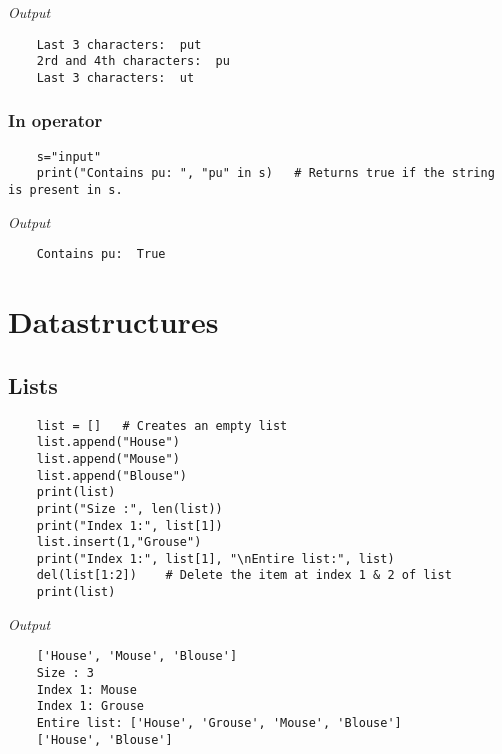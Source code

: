 \documentclass{report}
\begin{document}
	\textit{Output}
	\vspace{-15pt}
	\begin{verbatim}
	Last 3 characters:  put
	2rd and 4th characters:  pu
	Last 3 characters:  ut
	\end{verbatim}
	\vspace{-10pt}
	
	\subsection{In operator}
	\vspace{-15pt}
	\begin{verbatim}
	s="input"
	print("Contains pu: ", "pu" in s)   # Returns true if the string is present in s.
	\end{verbatim}
	\vspace{-10pt}
	
	\textit{Output}
	\vspace{-15pt}
	\begin{verbatim}
	Contains pu:  True
	\end{verbatim}
	\vspace{-10pt}
	
	\chapter{Datastructures}
	\section{Lists}
	\vspace{-15pt}
	\begin{verbatim}
	list = []   # Creates an empty list
	list.append("House")
	list.append("Mouse")
	list.append("Blouse")
	print(list)
	print("Size :", len(list))
	print("Index 1:", list[1])
	list.insert(1,"Grouse")
	print("Index 1:", list[1], "\nEntire list:", list)
	del(list[1:2])    # Delete the item at index 1 & 2 of list
	print(list)
	\end{verbatim}
	\vspace{-10pt}
	
	\textit{Output}
	\vspace{-15pt}
	\begin{verbatim}
	['House', 'Mouse', 'Blouse']
	Size : 3
	Index 1: Mouse
	Index 1: Grouse 
	Entire list: ['House', 'Grouse', 'Mouse', 'Blouse']
	['House', 'Blouse']
	\end{verbatim}
	\vspace{-10pt}
	
\end{document}
